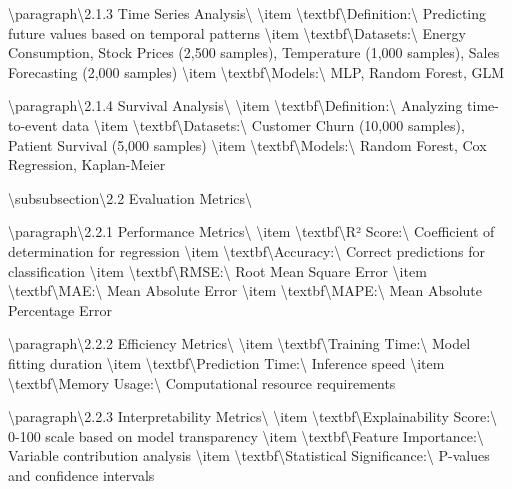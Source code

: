 \documentclass[11pt,a4paper]{article}
\begin{document}
\textbackslash{}paragraph\textbackslash{}{2.1.3 Time Series Analysis\textbackslash{}}
\textbackslash{}item \textbackslash{}textbf\textbackslash{}{Definition:\textbackslash{}} Predicting future values based on temporal patterns
\textbackslash{}item \textbackslash{}textbf\textbackslash{}{Datasets:\textbackslash{}} Energy Consumption, Stock Prices (2,500 samples), Temperature (1,000 samples), Sales Forecasting (2,000 samples)
\textbackslash{}item \textbackslash{}textbf\textbackslash{}{Models:\textbackslash{}} MLP, Random Forest, GLM

\textbackslash{}paragraph\textbackslash{}{2.1.4 Survival Analysis\textbackslash{}}
\textbackslash{}item \textbackslash{}textbf\textbackslash{}{Definition:\textbackslash{}} Analyzing time-to-event data
\textbackslash{}item \textbackslash{}textbf\textbackslash{}{Datasets:\textbackslash{}} Customer Churn (10,000 samples), Patient Survival (5,000 samples)
\textbackslash{}item \textbackslash{}textbf\textbackslash{}{Models:\textbackslash{}} Random Forest, Cox Regression, Kaplan-Meier

\textbackslash{}subsubsection\textbackslash{}{2.2 Evaluation Metrics\textbackslash{}}

\textbackslash{}paragraph\textbackslash{}{2.2.1 Performance Metrics\textbackslash{}}
\textbackslash{}item \textbackslash{}textbf\textbackslash{}{R² Score:\textbackslash{}} Coefficient of determination for regression
\textbackslash{}item \textbackslash{}textbf\textbackslash{}{Accuracy:\textbackslash{}} Correct predictions for classification
\textbackslash{}item \textbackslash{}textbf\textbackslash{}{RMSE:\textbackslash{}} Root Mean Square Error
\textbackslash{}item \textbackslash{}textbf\textbackslash{}{MAE:\textbackslash{}} Mean Absolute Error
\textbackslash{}item \textbackslash{}textbf\textbackslash{}{MAPE:\textbackslash{}} Mean Absolute Percentage Error

\textbackslash{}paragraph\textbackslash{}{2.2.2 Efficiency Metrics\textbackslash{}}
\textbackslash{}item \textbackslash{}textbf\textbackslash{}{Training Time:\textbackslash{}} Model fitting duration
\textbackslash{}item \textbackslash{}textbf\textbackslash{}{Prediction Time:\textbackslash{}} Inference speed
\textbackslash{}item \textbackslash{}textbf\textbackslash{}{Memory Usage:\textbackslash{}} Computational resource requirements

\textbackslash{}paragraph\textbackslash{}{2.2.3 Interpretability Metrics\textbackslash{}}
\textbackslash{}item \textbackslash{}textbf\textbackslash{}{Explainability Score:\textbackslash{}} 0-100 scale based on model transparency
\textbackslash{}item \textbackslash{}textbf\textbackslash{}{Feature Importance:\textbackslash{}} Variable contribution analysis
\textbackslash{}item \textbackslash{}textbf\textbackslash{}{Statistical Significance:\textbackslash{}} P-values and confidence intervals
\end{document}
